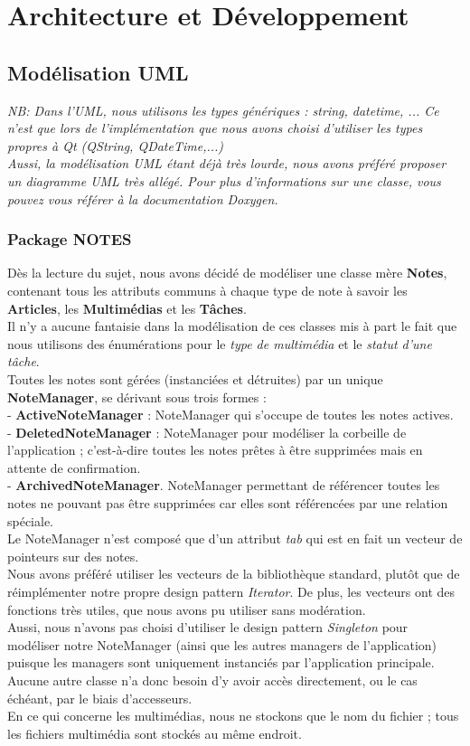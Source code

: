 \documentclass[a4paper]{report}
\begin{document}
\newpage
\section{Architecture et Développement}
\subsection{Modélisation UML}

\textit{NB: Dans l'UML, nous utilisons les types génériques : string, datetime, ... Ce n'est que lors de l'implémentation que nous avons choisi d'utiliser les types propres à Qt (QString, QDateTime,...) \\ Aussi, la modélisation UML étant déjà très lourde, nous avons préféré proposer un diagramme UML très allégé. Pour plus d'informations sur une classe, vous pouvez vous référer à la documentation Doxygen.}

\subsubsection{Package NOTES}
Dès la lecture du sujet, nous avons décidé de modéliser une classe mère \textbf{Notes}, contenant tous les attributs communs à chaque type de note à savoir les \textbf{Articles}, les \textbf{Multimédias} et les \textbf{Tâches}.\\
Il n'y a aucune fantaisie dans la modélisation de ces classes mis à part le fait que nous utilisons des énumérations pour le \textit{type de multimédia} et le \textit{statut d'une tâche}. \\
Toutes les notes sont gérées (instanciées et détruites) par un unique \textbf{NoteManager}, se dérivant sous trois formes : \\
- \textbf{ActiveNoteManager} : NoteManager qui s'occupe de toutes les notes actives.\\
- \textbf{DeletedNoteManager} : NoteManager pour modéliser la corbeille de l'application ; c'est-à-dire toutes les notes prêtes à être supprimées mais en attente de confirmation. \\
- \textbf{ArchivedNoteManager}. NoteManager permettant de référencer toutes les notes ne pouvant pas être supprimées car elles sont référencées par une relation spéciale.\\
Le NoteManager n'est composé que d'un attribut \textit{tab} qui est en fait un vecteur de pointeurs sur des notes.\\
Nous avons préféré utiliser les vecteurs de la bibliothèque standard, plutôt que de réimplémenter notre propre design pattern \textit{Iterator}. De plus, les vecteurs ont des fonctions très utiles, que nous avons pu utiliser sans modération. \\
Aussi, nous n'avons pas choisi d'utiliser le design pattern \textit{Singleton} pour modéliser notre NoteManager (ainsi que les autres managers de l'application) puisque les managers sont uniquement instanciés par l'application principale. Aucune autre classe n'a donc besoin d'y avoir accès directement, ou le cas échéant, par le biais d'accesseurs.\\
En ce qui concerne les multimédias, nous ne stockons que le nom du fichier ; tous les fichiers multimédia sont stockés au même endroit.
\end{document}
